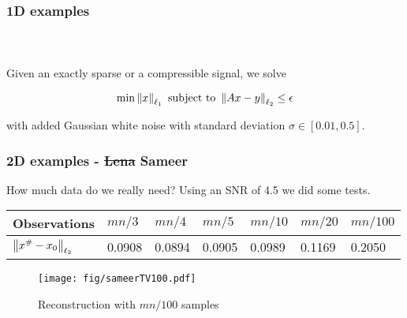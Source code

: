 
\begin{frame}[t]
\frametitle{1D examples}
\framesubtitle{~~}  %

Given an exactly sparse or a compressible signal, we solve

\begin{align*}
	\min \left\lVert x \right\rVert_{\ell_1} \text{ subject to } \left\lVert Ax - y \right\rVert_{\ell_2} \leq \epsilon
\end{align*}

with added Gaussian white noise with standard deviation $\sigma\in [0.01,0.5]$.


\end{frame}


\begin{frame}[t]
	\frametitle{2D examples - \st{Lena} Sameer}

How much data do we really need? Using an SNR of 4.5 we did some tests.
\pause

\begin{table}[h]
\begin{tabular}{l|l|l|l|l|l|l}
Observations                 & $mn/3$ & $mn/4$ & $mn/5$ & $mn/10$ & $mn/20$ & $mn/100$ \\ \hline
$\left\lVert x^\# - x_0 \right\rVert_{\ell_2}$ & 0.0908 & 0.0894 & 0.0905 & 0.0989  & 0.1169  & 0.2050   \\
\end{tabular}
\end{table}
\pause

\begin{figure}
\centering
\texttt{[image: fig/sameerTV100.pdf]}
\caption{Reconstruction with $mn/100$ samples}
\end{figure}

\end{frame}




